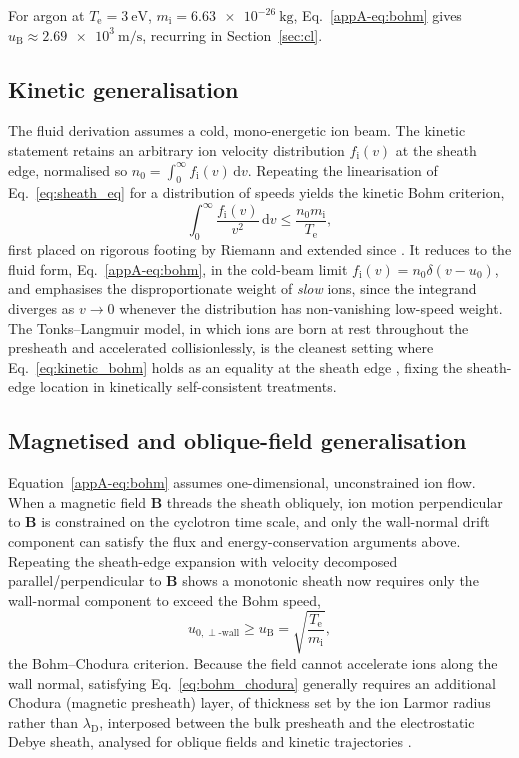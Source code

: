 For argon at $T_{\mathrm{e}} = \SI{3}{\electronvolt}$, $m_{\mathrm{i}} = \SI{6.63e-26}{\kilo\gram}$, Eq.~\eqref{appA-eq:bohm} gives $u_{\mathrm{B}} \approx \SI{2.69e3}{\meter\per\second}$, recurring in Section~\ref{sec:cl}.

\subsection{Kinetic generalisation}

The fluid derivation assumes a cold, mono-energetic ion beam. The kinetic statement retains an arbitrary ion velocity distribution $f_{\mathrm{i}}(v)$ at the sheath edge, normalised so $n_{0} = \int_{0}^{\infty} f_{\mathrm{i}}(v)\,\mathrm{d}v$. Repeating the linearisation of Eq.~\eqref{eq:sheath_eq} for a distribution of speeds yields the kinetic Bohm criterion,
\begin{equation}
\int_{0}^{\infty} \frac{f_{\mathrm{i}}(v)}{v^{2}}\,\mathrm{d}v \le \frac{n_{0}m_{\mathrm{i}}}{T_{\mathrm{e}}},
\label{eq:kinetic_bohm}
\end{equation}
first placed on rigorous footing by Riemann \cite{ref0001} and extended since \cite{ref0004,ref0015}. It reduces to the fluid form, Eq.~\eqref{appA-eq:bohm}, in the cold-beam limit $f_{\mathrm{i}}(v) = n_{0}\delta(v-u_{0})$, and emphasises the disproportionate weight of \emph{slow} ions, since the integrand diverges as $v \to 0$ whenever the distribution has non-vanishing low-speed weight. The Tonks--Langmuir model, in which ions are born at rest throughout the presheath and accelerated collisionlessly, is the cleanest setting where Eq.~\eqref{eq:kinetic_bohm} holds as an equality at the sheath edge \cite{ref0665,ref0666}, fixing the sheath-edge location in kinetically self-consistent treatments.

\subsection{Magnetised and oblique-field generalisation}

Equation~\eqref{appA-eq:bohm} assumes one-dimensional, unconstrained ion flow. When a magnetic field $\mathbf{B}$ threads the sheath obliquely, ion motion perpendicular to $\mathbf{B}$ is constrained on the cyclotron time scale, and only the wall-normal drift component can satisfy the flux and energy-conservation arguments above. Repeating the sheath-edge expansion with velocity decomposed parallel/perpendicular to $\mathbf{B}$ shows a monotonic sheath now requires only the wall-normal component to exceed the Bohm speed,
\begin{equation}
u_{0,\perp\text{-wall}} \ge u_{\mathrm{B}} = \sqrt{\frac{T_{\mathrm{e}}}{m_{\mathrm{i}}}},
\label{eq:bohm_chodura}
\end{equation}
the Bohm--Chodura criterion. Because the field cannot accelerate ions along the wall normal, satisfying Eq.~\eqref{eq:bohm_chodura} generally requires an additional Chodura (magnetic presheath) layer, of thickness set by the ion Larmor radius rather than $\lambda_{\mathrm{D}}$, interposed between the bulk presheath and the electrostatic Debye sheath, analysed for oblique fields and kinetic trajectories \cite{ref0017}.

